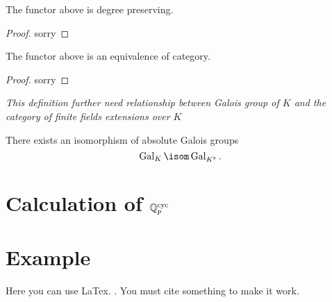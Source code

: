 \begin{theorem}
    \label{tilting_finite_degree_preserving}
    \notready

    The functor above is degree preserving.
\end{theorem}

\begin{proof}
    \notready

    sorry
\end{proof}

\begin{theorem}
    \label{tilting_finite_equivalence_of_category}
    \notready

    The functor above is an equivalence of category.
\end{theorem}

\begin{proof}
    \notready

    sorry
\end{proof}

\begin{definition}
    \label{Galois Isomorphism of Perfectoid Fields}
    \notready

    \emph{This definition further need relationship between Galois group of $K$ and the category of finite fields extensions over $K$}

    There exists an isomorphism of absolute Galois groups
    $$ \Gal_K \isom \Gal_{K^\flat}.$$
\end{definition}

\section{Calculation of $\mathbb{Q}_p^{{\text{cyc}}}$}


\section{Example}
Here you can use LaTex. \cite{marcus}. You must cite something to make it work.


